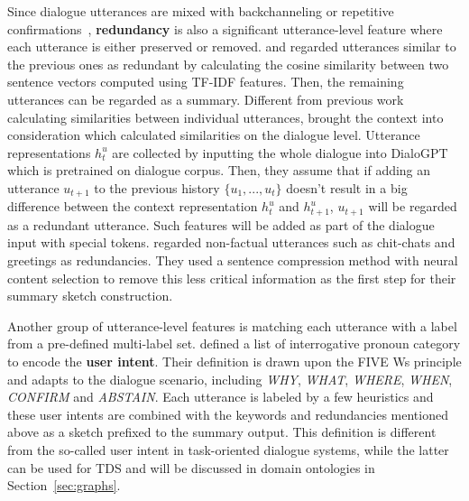 Since dialogue utterances are mixed with backchanneling or repetitive confirmations~\cite{sacks1978simplest}, \textbf{redundancy} is also a significant 
utterance-level feature where each utterance is either preserved or removed. 
\citet{murray2005extractive} and \citet{zechner2002automatic} regarded 
utterances similar to the previous ones as redundant by calculating 
the cosine similarity between two sentence vectors %
computed using TF-IDF features. {Then, the remaining utterances can be regarded as a summary}.
Different from previous work calculating similarities between individual utterances,
\citet{feng2021language} brought the context into consideration which calculated similarities on the dialogue level.
Utterance representations $h_t^u$ are collected by inputting the whole dialogue into DialoGPT~\cite{zhang2020dialogpt} which is pretrained on 
dialogue corpus. 
Then, they assume that if adding an utterance $u_{t+1}$ to the 
previous history $\{u_1, ..., u_t\}$ doesn't result in a big difference 
between the context representation $h_t^u$ and $h_{t+1}^u$, 
$u_{t+1}$ will be regarded as a redundant utterance. 
Such features will be added as part of the dialogue input with special tokens. 
\citet{wu2021controllable} regarded non-factual utterances 
such as chit-chats and greetings as redundancies.
They used a sentence compression method with neural content selection to 
remove this less critical information as the first step for their summary 
sketch construction.

Another group of utterance-level features is matching each utterance with 
a label from a pre-defined multi-label set. \citet{wu2021controllable} defined 
a list of interrogative pronoun category to encode the \textbf{user intent}. 
Their definition is drawn upon the FIVE Ws principle and adapts to the 
dialogue scenario, including \textit{WHY}, \textit{WHAT}, \textit{WHERE}, 
\textit{WHEN}, \textit{CONFIRM} and \textit{ABSTAIN}. %
Each utterance is labeled by a few heuristics and these user intents are combined with the keywords and redundancies mentioned above as a sketch prefixed to the summary output.
This definition is different from the so-called user intent in task-oriented dialogue systems, while the latter can be used for TDS and will be discussed in domain ontologies in Section~\ref{sec:graphs}.

